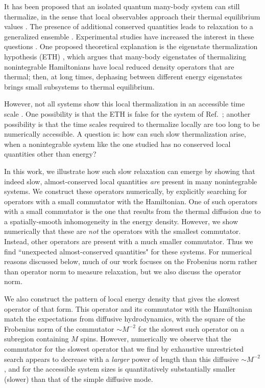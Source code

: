 \documentclass[twocolumn,superscriptaddress, prl,showpacs]{revtex4-1}
\begin{document}
It has been proposed that an isolated quantum many-body system can still thermalize, in the sense that local observables approach their thermal equilibrium values \cite{Deutsch:1991,Srednicki:1994,Rigol:2008}.  The presence of additional conserved quantities leads to relaxation to a generalized ensemble \cite{Rigol:2007,Calabrese:2011,Gogolin:2011,Fagotti:2014}.  Experimental studies have increased the interest in these questions \cite{Polkovnikov:2011, Yukalov:2011}.  One proposed theoretical explanation is the eigenstate thermalization hypothesis (ETH) \cite{Deutsch:1991,Srednicki:1994,Rigol:2008,Santos:2010,Rigol:2012,Kruczenski:2013,Beugeling:2014,Sorg:2014,Kim_ETH,Goldstein:2014}, which argues that many-body eigenstates of thermalizing nonintegrable Hamiltonians have local reduced density operators that are thermal; then, at long times, dephasing between different energy eigenstates brings small subsystems to thermal equilibrium.

However, not all systems show this local thermalization in an accessible time scale \cite{Banuls:2011}.
One possibility is that the ETH is false for the system of Ref.~; another possibility is that the time scales required to thermalize locally are too long to be numerically accessible.  A question is: how can such slow thermalization arise, when a nonintegrable system like the one studied has no conserved local quantities other than energy?

In this work, we illustrate how such slow relaxation can emerge by showing that indeed slow, almost-conserved local quantities {\it are} present in many nonintegrable systems.  We construct these operators numerically, by explicitly searching for operators with a small commutator with the Hamiltonian.
One of such operators with a small commutator is the one that results from the thermal diffusion due to a spatially-smooth inhomogeneity in the energy density.  However, we show numerically that these are {\it not} the operators with the smallest commutator.  Instead, other operators are present with a much smaller commutator.  Thus we find ``unexpected almost-conserved quantities" for these systems.  For numerical reasons discussed below, much of our work focuses on the Frobenius norm rather than operator norm to measure relaxation, but we also discuss the operator norm.


We also construct the pattern of local energy density that gives the slowest operator of that form.  This operator and its commutator with the Hamiltonian
match the expectations from diffusive hydrodynamics, with the square of the Frobenius norm of the commutator $\sim M^{-2}$ for the slowest such operator on a subregion containing $M$ spins.
However, numerically we observe that the commutator for the slowest operator that we find by exhaustive unrestricted search appears to decrease with a {\it larger} power of length than this diffusive $\sim M^{-2}$, and for the accessible system sizes is quantitatively substantially smaller (slower) than that of the simple diffusive mode.
\end{document}
